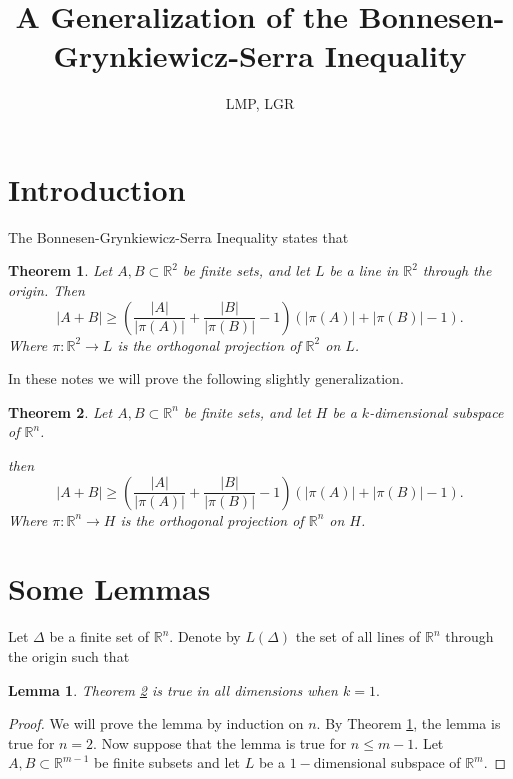 \documentclass[12pt]{article}
\title{A Generalization of the Bonnesen-Grynkiewicz-Serra Inequality}
\author{LMP, LGR}
\newcommand{\R}{\mathbb{R}}
\newtheorem{theorem}{Theorem}
\newtheorem{lemma}{Lemma}
\begin{document}
\maketitle

\section{Introduction}
The Bonnesen-Grynkiewicz-Serra Inequality states that %
\begin{theorem} \label{GS}
Let $A, B \subset \R^2$ be finite sets, and let $L$ be a line in $\R^2$ through the origin. Then
$$\lvert A + B \rvert \geq \left( \frac{\lvert A \rvert }{\lvert \pi (A) \rvert} + \frac{\lvert B \rvert }{\lvert \pi (B) \rvert } - 1\right) \left( \lvert \pi(A) \rvert + \lvert \pi(B) \rvert - 1 \right).$$
Where $\pi: \R^2 \rightarrow L$ is the orthogonal projection of $\R^2$ on $L$.
\end{theorem}

In these notes we will prove the following slightly generalization.
\begin{theorem} \label{res}
Let $A, B \subset \R^n$ be finite sets, and let $H$ be a $k$-dimensional subspace of $\R^n$. 

then
$$\lvert A + B \rvert \geq \left( \frac{\lvert A \rvert }{\lvert \pi (A) \rvert} + \frac{\lvert B \rvert }{\lvert \pi (B) \rvert } - 1\right) \left( \lvert \pi(A) \rvert + \lvert \pi(B) \rvert - 1 \right).$$
Where $\pi: \R^n \rightarrow H$ is the orthogonal projection of $\R^n$ on $H$.
\end{theorem}


\section{Some Lemmas}
Let $\Delta$ be a finite set of $\R^n.$ Denote by $L(\Delta)$ the set of all lines of $\R^n$ through the origin such that 

\begin{lemma}
Theorem \ref{res} is true in all dimensions when $k=1.$
\end{lemma}
\begin{proof}
We will prove the lemma by induction on $n$. By Theorem \ref{GS}, the lemma is true for $n = 2.$ Now suppose that the lemma is true for $n\leq m - 1.$ Let $A, B \subset \R^{m-1}$ be finite subsets and let $L$ be a $1-$dimensional subspace of $\R^m.$
\end{proof}
\end{document}
